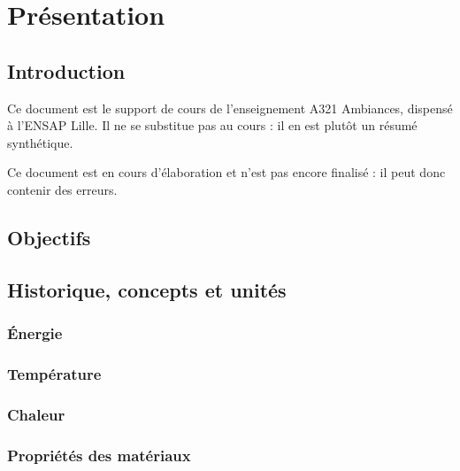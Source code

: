\part{Présentation}

\chapter{Introduction}
\label{chap:introduction}

Ce document est le support de cours de l'enseignement A321 Ambiances, dispensé à l'ENSAP Lille. Il ne se substitue pas au cours : il en est plutôt un résumé synthétique.

Ce document est en cours d'élaboration et n'est pas encore finalisé : il peut donc contenir des erreurs.

\chapter{Objectifs}
\label{chap:objectifs}

\chapter{Historique, concepts et unités}
\label{chap:concepts}

\section{Énergie}

\section{Température}

\section{Chaleur}

\section{Propriétés des matériaux}
